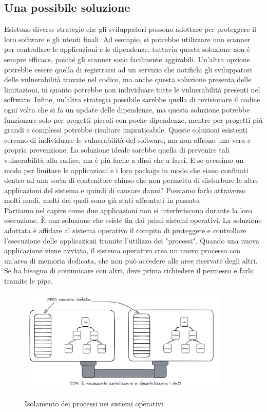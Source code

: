 \subsection{Una possibile soluzione}
Esistono diverse strategie che gli sviluppatori possono adottare per proteggere il loro software e gli utenti finali. Ad
esempio, si potrebbe utilizzare uno scanner per controllare le applicazioni e le dipendenze, tuttavia questa soluzione
non è sempre efficace, poiché gli scanner sono facilmente aggirabili. Un'altra opzione potrebbe essere quella di
registrarsi ad un servizio che notifichi gli sviluppatori delle vulnerabilità trovate nel codice, ma anche questa
soluzione presenta delle limitazioni, in quanto potrebbe non individuare tutte le vulnerabilità presenti nel software.
Infine, un'altra strategia possibile sarebbe quella di revisionare il codice ogni volta che si fa un update delle
dipendenze, ma questa soluzione potrebbe funzionare solo per progetti piccoli con poche dipendenze, mentre per progetti
più grandi e complessi potrebbe risultare impraticabile. Queste soluzioni esistenti cercano di individuare le
vulnerabilità del software, ma non offrono una vera e propria prevenzione. La soluzione ideale sarebbe quella di
prevenire tali vulnerabilità alla radice, ma è più facile a dirsi che a farsi. E se avessimo un modo per limitare le
applicazioni e i loro package in modo che siano confinati dentro ad una sorta di contenitore chiuso che non permetta di
disturbare le altre applicazioni del sistema e quindi di causare danni? Possiamo farlo attraverso molti modi, molti dei
quali sono già stati affrontati in passato. \\
Partiamo nel capire come due applicazioni non si interferiscono durante la loro esecuzione. È una soluzione che esiste
fin dai primi sistemi operativi. La soluzione adottata è affidare al sistema operativo il compito di proteggere e
controllare l'esecuzione delle applicazioni tramite l'utilizzo dei "processi". Quando una nuova applicazione viene
avviata, il sistema operativo crea un nuovo processo con un'area di memoria dedicata, che non può accedere alle aree
riservate degli altri. Se ha bisogno di comunicare con altri, deve prima richiedere il permesso e farlo tramite le pipe.
\begin{figure}[H]
    \centering
    \captionsetup{justification=centering}
    \includegraphics[width=10cm]{./chapters/2.wasi-in-depth/images/2.process_isolation.png}
    \label{process_isolation}
    \caption{Isolamento dei processi nei sistemi operativi}
\end{figure}
